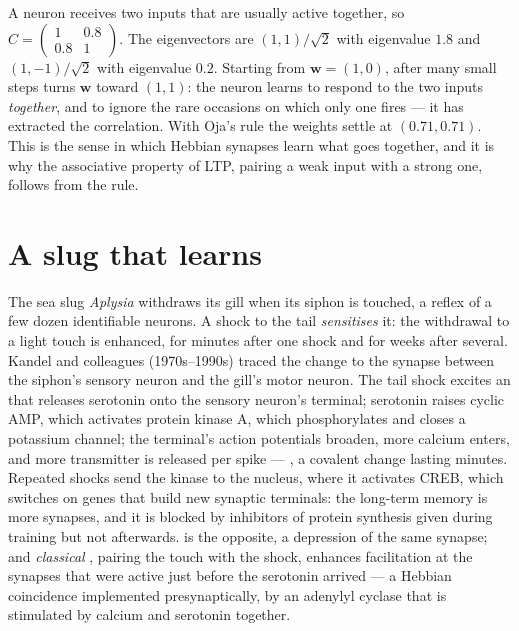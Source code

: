 \begin{example}\label{ex:b3:learning-memory:two-inputs}
A neuron receives two inputs that are usually active together, so $C =
\begin{pmatrix} 1 & 0.8 \\ 0.8 & 1\end{pmatrix}$. The eigenvectors are
$(1,1)/\sqrt{2}$ with eigenvalue $1.8$ and $(1,-1)/\sqrt{2}$ with
eigenvalue $0.2$. Starting from $\mathbf{w} = (1, 0)$,  after
many small steps turns $\mathbf{w}$ toward $(1,1)$: the neuron learns to
respond to the two inputs \emph{together}, and to ignore the rare
occasions on which only one fires --- it has extracted the correlation.
With Oja's rule the weights settle at $(0.71, 0.71)$. This is the sense
in which Hebbian synapses learn what goes together, and it is why the
associative property of LTP, pairing a weak input with a strong one,
follows from the rule.
\end{example}

\section{A slug that learns}

\begin{proposition}\label{prop:b3:learning-memory:aplysia}
The sea slug \emph{Aplysia} withdraws its gill when its siphon is
touched, a reflex of a few dozen identifiable neurons. A shock to the
tail \emph{sensitises} it: the withdrawal to a light touch is enhanced,
for minutes after one shock and for weeks after several. Kandel and
colleagues (1970s--1990s) traced the change to the synapse between the
siphon's sensory neuron and the gill's motor neuron. The tail shock
excites an  that releases serotonin onto the sensory
neuron's terminal; serotonin raises cyclic AMP, which activates
protein kinase A, which phosphorylates and closes a potassium channel;
the terminal's action potentials broaden, more calcium enters, and more
transmitter is released per spike --- \emph{},
a covalent change lasting minutes. Repeated shocks send the kinase to
the nucleus, where it activates CREB, which switches on genes that
build new synaptic terminals: the long-term memory is more synapses,
and it is blocked by inhibitors of protein synthesis given during
training but not afterwards. \emph{} is the opposite,
a depression of the same synapse; and \emph{classical },
pairing the touch with the shock, enhances facilitation at the
synapses that were active just before the serotonin arrived --- a
Hebbian coincidence implemented presynaptically, by an adenylyl
cyclase that is stimulated by calcium and serotonin together.
\end{proposition}


